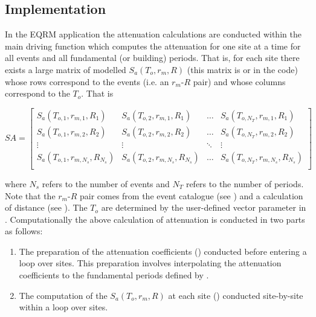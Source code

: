 \subsection{Implementation}
\label{attn:implementation}

In the EQRM application the attenuation calculations are conducted
within the main driving function  which
computes the attenuation for one site at a time for all events and
all fundamental (or building) periods. That is, for each site
there exists a large matrix of modelled $S_a(T_o,r_m,R)$ (this
matrix is  or  in the code)
whose rows correspond to the events (i.e. an $r_m$-$R$ pair) and
whose columns correspond to the $T_o$. That is

\begin{math}
 SA = \left[ \begin{array}{ccccc}
S_a(T_{o,1},r_{m,1},R_1) & S_a(T_{o,2},r_{m,1},R_1) &  \hdots & S_a(T_{o,N_T},r_{m,1},R_1) \\
S_a(T_{o,1},r_{m,2},R_2) & S_a(T_{o,2},r_{m,2},R_2) &  \hdots & S_a(T_{o,N_T},r_{m,2},R_2) \\
\vdots & \vdots &  \ddots & \vdots \\
S_a(T_{o,1},r_{m,N_s},R_{N_s}) & S_a(T_{o,2},r_{m,N_s},R_{N_s}) & \hdots & S_a(T_{o,N_T},r_{m,N_s},R_{N_s}) \\
\end{array} \right]
\end{math}

where $N_s$ refers to the number of events and $N_T$ refers to the
number of periods. Note that the $r_m$-$R$ pair comes from the
event catalogue (see ) and a calculation
of distance (see ). The $T_o$ are determined
by the user-defined vector parameter  in
. Computationally the above calculation of
attenuation is conducted in two parts as follows:
\begin{enumerate}
\item The preparation of the attenuation coefficients
() conducted before entering a loop over
sites. This preparation involves interpolating the attenuation
coefficients to the fundamental periods defined by
. \item The computation of the
$S_a(T_o,r_m,R)$ at each site ()
conducted site-by-site within a loop over sites.
\end{enumerate}


